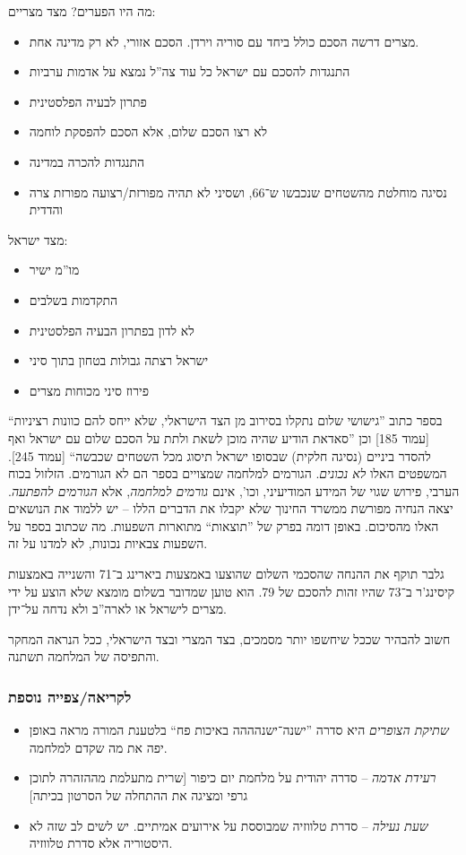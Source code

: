 \documentclass[]{../../../../tex/classes/styledArticle}
\begin{document}
	מה היו הפערים? מצד מצריים:
	\begin{itemize}
		\item מצרים דרשה הסכם כולל ביחד עם סוריה וירדן. הסכם אזורי, לא רק מדינה אחת. 
		\item התנגדות להסכם עם ישראל כל עוד צה''ל נמצא על אדמות ערביות
		\item פתרון לבעיה הפלסטינית
		\item לא רצו הסכם שלום, אלא הסכם להפסקת לוחמה
		\item התנגדות להכרה במדינה
		\item נסיגה מוחלטת מהשטחים שנכבשו ש־66, ושסיני לא תהיה מפורזת/רצועה מפורזת צרה והדדית
	\end{itemize}
	מצד ישראל: 
	\begin{itemize}
		\item מו''מ ישיר
		\item התקדמות בשלבים
		\item לא לדון בפתרון הבעיה הפלסטינית
		\item ישראל רצתה גבולות בטחון בתוך סיני
		\item פירוז סיני מכוחות מצרים
	\end{itemize}
	
	בספר כתוב ''גישושי שלום נתקלו בסירוב מן הצד הישראלי, שלא ייחס להם כוונות רציניות`` [עמוד 185] וכן ''סאדאת הודיע שהיה מוכן לשאת ולתת על הסכם שלום עם ישראל ואף להסדר ביניים (נסיגה חלקית) שבסופו ישראל תיסוג מכל השטחים שכבשה`` [עמוד 245]. המשפטים האלו \textit{לא נכונים}. הגורמים למלחמה שמצויים בספר הם לא הגורמים. הזלזול בכוח הערבי, פירוש שגוי של המידע המודיעיני, וכו', אינם \textit{גורמים למלחמה}, אלא \textit{הגורמים להפתעה}. יצאה הנחיה מפורשת ממשרד החינוך שלא יקבלו את הדברים הללו – יש ללמוד את הנושאים האלו מהסיכום. באופן דומה בפרק של ''תוצאות`` מתוארות השפעות. מה שכתוב בספר על השפעות צבאיות נכונות, לא למדנו על זה. 
	
	גלבר תוקף את ההנחה שהסכמי השלום שהוצעו באמצעות ביארינג ב־71 והשנייה באמצעות קיסינג'ר ב־73 שהיו זהות להסכם של 79. הוא טוען שמדובר בשלום מומצא שלא הוצע על ידי מצרים לישראל או לארה''ב ולא נדחה על־ידן. 
	
	חשוב להבהיר שככל שיחשפו יותר מסמכים, בצד המצרי ובצד הישראלי, ככל הנראה המחקר והתפיסה של המלחמה תשתנה. 
	
	\subsubsection*{לקריאה/צפייה נוספת}
	
	\begin{itemize}
		\item \textit{שתיקת הצופרים} היא סדרה ''ישנה־ישנהההה באיכות פח`` בלטענת המורה מראה באופן יפה את מה שקדם למלחמה. 
		\item \textit{רעידת אדמה} – סדרה יהודית על מלחמת יום כיפור [שרית מתעלמת מההזהרה לתוכן גרפי ומציגה את ההתחלה של הסרטון בכיתה]
		\item \textit{שעת נעילה} – סדרת טלווזיה שמבוססת על אירועים אמיתיים. יש לשים לב שזה לא היסטוריה אלא סדרת טלווזיה. 
	\end{itemize}
	
\end{document}
